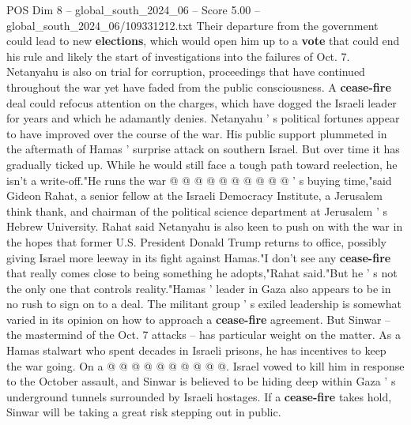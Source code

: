 \begin{textsample}{POS Dim 8 – global\_south\_2024\_06 – Score 5.00 – global\_south\_2024\_06/109331212.txt}
Their departure from the government could lead to new \textbf{elections}, which would open him up to a \textbf{vote} that could end his rule and likely the start of investigations into the failures of Oct. 7.
Netanyahu is also on trial for corruption, proceedings that have continued throughout the war yet have faded from the public consciousness.
A \textbf{cease-fire} deal could refocus attention on the charges, which have dogged the Israeli leader for years and which he adamantly denies.
Netanyahu ' s political fortunes appear to have improved over the course of the war.
His public support plummeted in the aftermath of Hamas ' surprise attack on southern Israel.
But over time it has gradually ticked up.
While he would still face a tough path toward reelection, he isn't a write-off."He runs the war @ @ @ @ @ @ @ @ @ @ ' s buying time,"said Gideon Rahat, a senior fellow at the Israeli Democracy Institute, a Jerusalem think thank, and chairman of the political science department at Jerusalem ' s Hebrew University.
Rahat said Netanyahu is also keen to push on with the war in the hopes that former U.S.
President Donald Trump returns to office, possibly giving Israel more leeway in its fight against Hamas."I don't see any \textbf{cease-fire} that really comes close to being something he adopts,"Rahat said."But he ' s not the only one that controls reality."Hamas ' leader in Gaza also appears to be in no rush to sign on to a deal.
The militant group ' s exiled leadership is somewhat varied in its opinion on how to approach a \textbf{cease-fire} agreement.
But Sinwar -- the mastermind of the Oct. 7 attacks -- has particular weight on the matter.
As a Hamas stalwart who spent decades in Israeli prisons, he has incentives to keep the war going.
On a @ @ @ @ @ @ @ @ @ @.
Israel vowed to kill him in response to the October assault, and Sinwar is believed to be hiding deep within Gaza ' s underground tunnels surrounded by Israeli hostages.
If a \textbf{cease-fire} takes hold, Sinwar will be taking a great risk stepping out in public.

\end{textsample}
